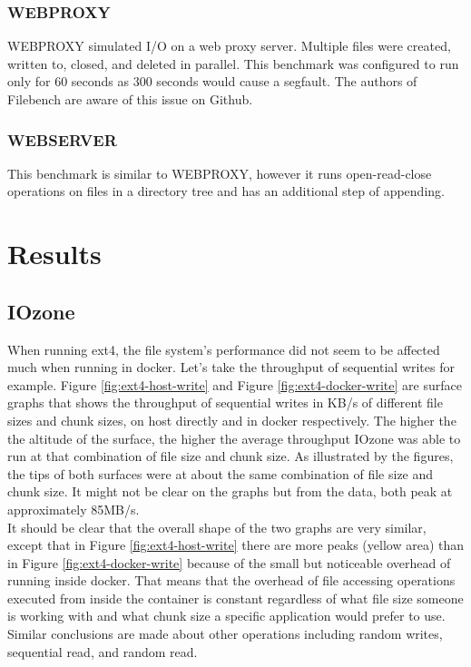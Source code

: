 \documentclass[letterpaper,twocolumn,10pt]{article}
\begin{document}
\subsubsection{WEBPROXY}
WEBPROXY simulated I/O on a web proxy server. Multiple files were created, written to, closed, and deleted in parallel. This benchmark was configured to run only for 60 seconds as 300 seconds would cause a segfault. The authors of Filebench are aware of this issue on Github.

\subsubsection{WEBSERVER}
This benchmark is similar to WEBPROXY, however it runs open-read-close operations on files in a directory tree and has an additional step of appending. 

\section{Results}
\subsection{IOzone}
When running ext4, the file system's performance did not seem to be affected much when running in docker. Let's take the throughput of sequential writes for example. Figure \ref{fig:ext4-host-write} and Figure \ref{fig:ext4-docker-write} are surface graphs that shows the throughput of sequential writes in KB/s of different file sizes and chunk sizes, on host directly and in docker respectively. The higher the the altitude of the surface, the higher the average throughput IOzone was able to run at that combination of file size and chunk size. As illustrated by the figures, the tips of both surfaces were at about the same combination of file size and chunk size. It might not be clear on the graphs but from the data, both peak at approximately 85MB/s. \\

It should be clear that the overall shape of the two graphs are very similar, except that in Figure \ref{fig:ext4-host-write} there are more peaks (yellow area) than in Figure \ref{fig:ext4-docker-write} because of the small but noticeable overhead of running inside docker. That means that the overhead of file accessing operations executed from inside the container is constant regardless of what file size someone is working with and what chunk size a specific application would prefer to use. Similar conclusions are made about other operations including random writes, sequential read, and random read. \\
\end{document}
